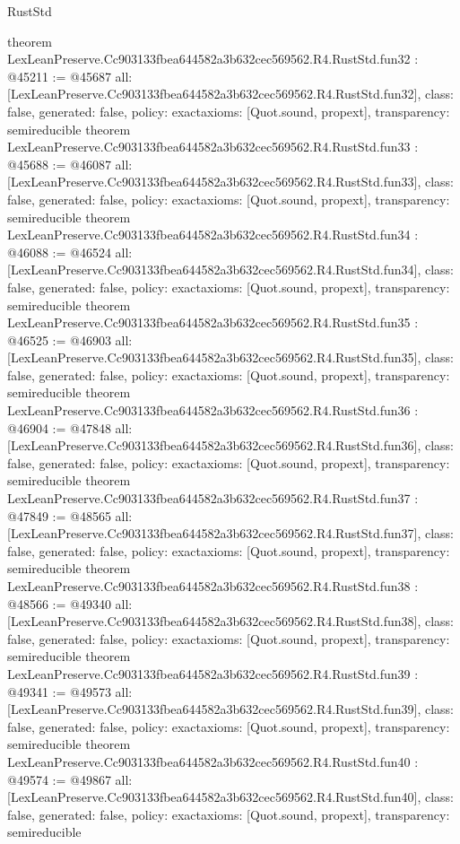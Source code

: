 \begin{lexlean}{RustStd}
\begin{coremodule}
{}
theorem LexLeanPreserve.Cc903133fbea644582a3b632cec569562.R4.RustStd.fun32 : @45211 := @45687 {
  all: [LexLeanPreserve.Cc903133fbea644582a3b632cec569562.R4.RustStd.fun32],
  class: false,
  generated: false,
  policy: exact{axioms: [Quot.sound, propext]},
  transparency: semireducible
}
theorem LexLeanPreserve.Cc903133fbea644582a3b632cec569562.R4.RustStd.fun33 : @45688 := @46087 {
  all: [LexLeanPreserve.Cc903133fbea644582a3b632cec569562.R4.RustStd.fun33],
  class: false,
  generated: false,
  policy: exact{axioms: [Quot.sound, propext]},
  transparency: semireducible
}
theorem LexLeanPreserve.Cc903133fbea644582a3b632cec569562.R4.RustStd.fun34 : @46088 := @46524 {
  all: [LexLeanPreserve.Cc903133fbea644582a3b632cec569562.R4.RustStd.fun34],
  class: false,
  generated: false,
  policy: exact{axioms: [Quot.sound, propext]},
  transparency: semireducible
}
theorem LexLeanPreserve.Cc903133fbea644582a3b632cec569562.R4.RustStd.fun35 : @46525 := @46903 {
  all: [LexLeanPreserve.Cc903133fbea644582a3b632cec569562.R4.RustStd.fun35],
  class: false,
  generated: false,
  policy: exact{axioms: [Quot.sound, propext]},
  transparency: semireducible
}
theorem LexLeanPreserve.Cc903133fbea644582a3b632cec569562.R4.RustStd.fun36 : @46904 := @47848 {
  all: [LexLeanPreserve.Cc903133fbea644582a3b632cec569562.R4.RustStd.fun36],
  class: false,
  generated: false,
  policy: exact{axioms: [Quot.sound, propext]},
  transparency: semireducible
}
theorem LexLeanPreserve.Cc903133fbea644582a3b632cec569562.R4.RustStd.fun37 : @47849 := @48565 {
  all: [LexLeanPreserve.Cc903133fbea644582a3b632cec569562.R4.RustStd.fun37],
  class: false,
  generated: false,
  policy: exact{axioms: [Quot.sound, propext]},
  transparency: semireducible
}
theorem LexLeanPreserve.Cc903133fbea644582a3b632cec569562.R4.RustStd.fun38 : @48566 := @49340 {
  all: [LexLeanPreserve.Cc903133fbea644582a3b632cec569562.R4.RustStd.fun38],
  class: false,
  generated: false,
  policy: exact{axioms: [Quot.sound, propext]},
  transparency: semireducible
}
theorem LexLeanPreserve.Cc903133fbea644582a3b632cec569562.R4.RustStd.fun39 : @49341 := @49573 {
  all: [LexLeanPreserve.Cc903133fbea644582a3b632cec569562.R4.RustStd.fun39],
  class: false,
  generated: false,
  policy: exact{axioms: [Quot.sound, propext]},
  transparency: semireducible
}
theorem LexLeanPreserve.Cc903133fbea644582a3b632cec569562.R4.RustStd.fun40 : @49574 := @49867 {
  all: [LexLeanPreserve.Cc903133fbea644582a3b632cec569562.R4.RustStd.fun40],
  class: false,
  generated: false,
  policy: exact{axioms: [Quot.sound, propext]},
  transparency: semireducible
}
\end{coremodule}
\end{lexlean}
